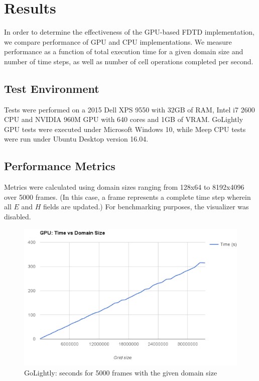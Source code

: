 \chapter{Results} \label{ch:conclusions}

In order to determine the effectiveness of the GPU-based FDTD implementation, we compare performance of GPU and CPU implementations. We measure performance as a function of total execution time for a given domain size and number of time steps, as well as number of cell operations completed per second. 

\section{Test Environment}

Tests were performed on a 2015 Dell XPS 9550 with 32GB of RAM, Intel i7 2600 CPU and NVIDIA 960M GPU with 640 cores and 1GB of VRAM. GoLightly GPU tests were executed under Microsoft Windows 10, while Meep CPU tests were run under Ubuntu Desktop version 16.04.
 

\section{Performance Metrics}

Metrics were calculated using domain sizes ranging from 128x64 to 8192x4096 over 5000 frames. (In this case, a frame represents a complete time step wherein all $E$ and $H$ fields are updated.) For benchmarking purposes, the visualizer was disabled.


\begin{figure}[H]
	\centering
	\includegraphics[width=\textwidth,
	keepaspectratio]{gpu_time_vs_domain_size.png}
	\caption{GoLightly: seconds for 5000 frames with the given domain size}
	\label{fig:gpuTimeVsDomainSize}
\end{figure}

